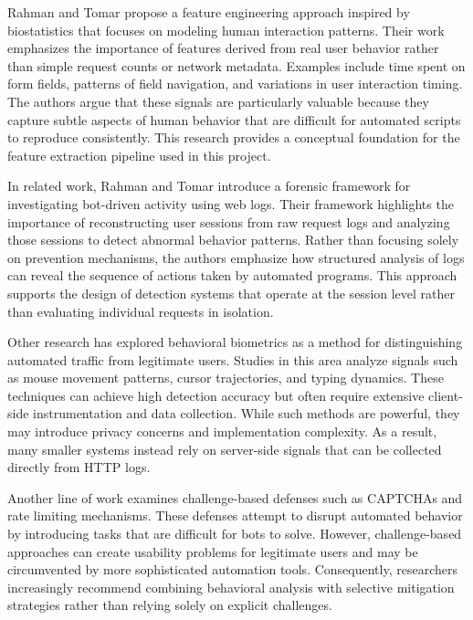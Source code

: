 \documentclass[12pt]{article}
\begin{document}
Rahman and Tomar \cite{rahman2020new} propose a feature engineering approach inspired by biostatistics that focuses on modeling human interaction patterns. Their work emphasizes the importance of features derived from real user behavior rather than simple request counts or network metadata. Examples include time spent on form fields, patterns of field navigation, and variations in user interaction timing. The authors argue that these signals are particularly valuable because they capture subtle aspects of human behavior that are difficult for automated scripts to reproduce consistently. This research provides a conceptual foundation for the feature extraction pipeline used in this project.

In related work, Rahman and Tomar \cite{rahman2020forensic} introduce a forensic framework for investigating bot-driven activity using web logs. Their framework highlights the importance of reconstructing user sessions from raw request logs and analyzing those sessions to detect abnormal behavior patterns. Rather than focusing solely on prevention mechanisms, the authors emphasize how structured analysis of logs can reveal the sequence of actions taken by automated programs. This approach supports the design of detection systems that operate at the session level rather than evaluating individual requests in isolation.

Other research has explored behavioral biometrics as a method for distinguishing automated traffic from legitimate users. Studies in this area analyze signals such as mouse movement patterns, cursor trajectories, and typing dynamics. These techniques can achieve high detection accuracy but often require extensive client-side instrumentation and data collection. While such methods are powerful, they may introduce privacy concerns and implementation complexity. As a result, many smaller systems instead rely on server-side signals that can be collected directly from HTTP logs.

Another line of work examines challenge-based defenses such as CAPTCHAs and rate limiting mechanisms. These defenses attempt to disrupt automated behavior by introducing tasks that are difficult for bots to solve. However, challenge-based approaches can create usability problems for legitimate users and may be circumvented by more sophisticated automation tools. Consequently, researchers increasingly recommend combining behavioral analysis with selective mitigation strategies rather than relying solely on explicit challenges.
\end{document}
